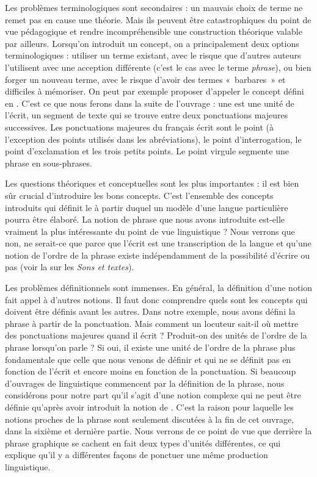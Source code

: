 {    Les problèmes terminologiques sont secondaires : un mauvais choix de terme ne remet pas en cause une théorie. Mais ils peuvent être catastrophiques du point de vue pédagogique et rendre incompréhensible une construction théorique valable par ailleurs. Lorsqu’on introduit un concept, on a principalement deux options terminologiques : utiliser un terme existant, avec le risque que d’autres auteurs l’utilisent avec une acception différente (c’est le cas avec le terme \textit{phrase}), ou bien forger un nouveau terme, avec le risque d’avoir des termes «~barbares~» et difficiles à mémoriser. On peut par exemple proposer d’appeler le concept défini en  . C’est ce que nous ferons dans la suite de l’ouvrage : une  est une unité de l’écrit, un segment de texte qui se trouve entre deux ponctuations majeures successives. Les ponctuations majeures du français écrit sont le point (à l’exception des points utilisés dans les abréviations), le point d’interrogation, le point d’exclamation et les trois petits points. Le point virgule segmente une phrase en sous-phrases.

    Les questions théoriques et conceptuelles sont les plus importantes : il est bien sûr crucial d’introduire les bons concepts. C’est l’ensemble des concepts introduits qui définit le  à partir duquel un modèle d’une langue particulière pourra être élaboré. La notion de phrase que nous avons introduite est-elle vraiment la plus intéressante du point de vue linguistique ? Nous verrons que non, ne serait-ce que parce que l’écrit est une transcription de la langue et qu’une notion de l’ordre de la phrase existe indépendamment de la possibilité d’écrire ou pas (voir la  sur les \textit{Sons et textes}).

    Les problèmes définitionnels sont immenses. En général, la définition d’une notion fait appel à d’autres notions. Il faut donc comprendre quels sont les concepts qui doivent être définis avant les autres. Dans notre exemple, nous avons défini la phrase à partir de la ponctuation. Mais comment un locuteur sait-il où mettre des ponctuations majeures quand il écrit ? Produit-on des unités de l’ordre de la phrase lorsqu’on parle ? Si oui, il existe une unité de l’ordre de la phrase plus fondamentale que celle que nous venons de définir et qui ne se définit pas en fonction de l’écrit et encore moins en fonction de la ponctuation. Si beaucoup d’ouvrages de linguistique commencent par la définition de la phrase, nous considérons pour notre part qu’il s’agit d’une notion complexe qui ne peut être définie qu’après avoir introduit la notion de . C’est la raison pour laquelle les notions proches de la phrase sont seulement discutées à la fin de cet ouvrage, dans la sixième et dernière partie. Nous verrons de ce point de vue que derrière la phrase graphique se cachent en fait deux types d’unités différentes, ce qui explique qu’il y a différentes façons de ponctuer une même production linguistique.
}
